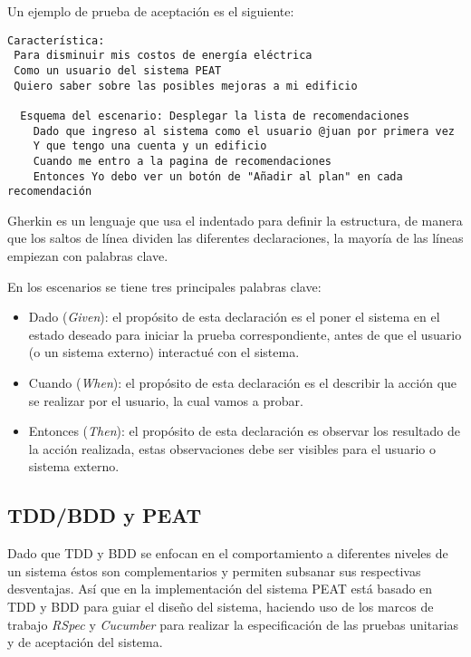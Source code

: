 \vspace{2.5mm}

Un ejemplo de prueba de aceptación es el siguiente:
\begin{lstlisting}
Característica:
 Para disminuir mis costos de energía eléctrica
 Como un usuario del sistema PEAT
 Quiero saber sobre las posibles mejoras a mi edificio

  Esquema del escenario: Desplegar la lista de recomendaciones
    Dado que ingreso al sistema como el usuario @juan por primera vez
    Y que tengo una cuenta y un edificio
    Cuando me entro a la pagina de recomendaciones
    Entonces Yo debo ver un botón de "Añadir al plan" en cada recomendación
\end{lstlisting}

Gherkin es un lenguaje que usa el indentado para definir la estructura, de manera
que los saltos de línea dividen las diferentes declaraciones,
la mayoría de las líneas empiezan con palabras clave.


\vspace{2.5mm}

En los escenarios se tiene tres principales palabras clave:
\begin{itemize}
\item Dado (\textit{Given}): el propósito de esta declaración es el poner
  el sistema en el estado deseado para iniciar la prueba correspondiente,
  antes de que el usuario (o un sistema externo) interactué con el sistema.
\item Cuando (\textit{When}): el propósito de esta declaración es el describir
  la acción que se realizar por el usuario, la cual vamos a probar.
\item Entonces (\textit{Then}): el propósito de esta declaración es observar
  los resultado de la acción realizada, estas observaciones debe ser visibles
  para el usuario o sistema externo.
\end{itemize}

\subsection{TDD/BDD y PEAT}
Dado que TDD y BDD se enfocan en el comportamiento a diferentes niveles
de un sistema éstos son complementarios y permiten subsanar sus respectivas
desventajas. Así que en la implementación del sistema PEAT está basado en
TDD y BDD para guiar el diseño del sistema, haciendo uso de los marcos
de trabajo \textit{RSpec} y \textit{Cucumber} para realizar la especificación
de las pruebas unitarias y de aceptación del sistema.

